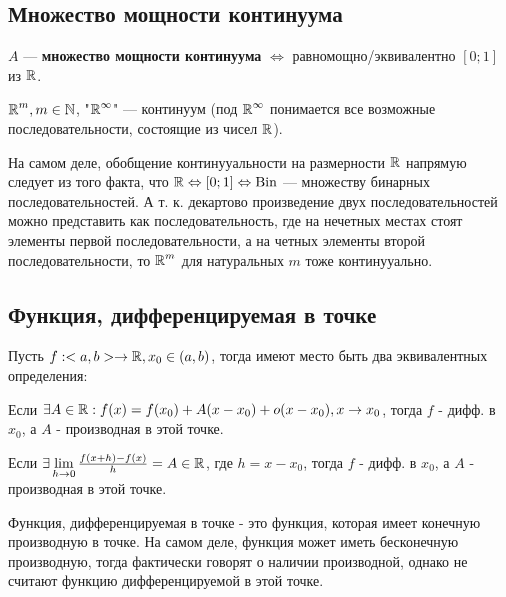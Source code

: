 \subsection{Множество мощности континуума}
\begin{definition}
  $A$ --- \textbf{множество мощности континуума} $\Leftrightarrow$ равномощно/эквивалентно $[0; 1]$ из $\operatorname*{\mathbb{R}}$.
\end{definition}
\begin{consequence}
    $\operatorname*{\mathbb{R}}^m, m \in \operatorname*{\mathbb{N}}$, "$\operatorname*{\mathbb{R}}^\infty$" {---} континуум (под $\operatorname*{\mathbb{R}}^\infty$ понимается все возможные последовательности, состоящие из чисел $\operatorname*{\mathbb{R}}$).
\end{consequence}
\begin{remark}
    На самом деле, обобщение континууальности на размерности $\operatorname*{\mathbb{R}}$ напрямую следует из того факта, что $\operatorname*{\mathbb{R}} \Leftrightarrow [0; 1] \Leftrightarrow \operatorname{Bin}$ {---} множеству бинарных последовательностей. А т. к. декартово произведение двух последовательностей можно представить как последовательность, где на нечетных местах стоят элементы первой последовательности, а на четных элементы второй последовательности, то $\operatorname*{\mathbb{R}}^m$ для натуральных $m$ тоже континууально.
\end{remark}

\newpage
\subsection{Функция, дифференцируемая в точке}
Пусть $f: <a, b> \rightarrow \operatorname*{\mathbb{R}}, x_0 \in (a, b)$, тогда имеют место быть два эквивалентных определения:
\begin{definition}
Если $\exists A \in \operatorname*{\mathbb{R}}: f(x) = f(x_0) + A(x - x_0) + o(x - x_0), x \rightarrow x_0$, тогда $f$ - дифф. в $x_0$, а $A$ - производная в этой точке.
\end{definition}
\begin{definition}
Если $\exists \lim\limits_{h \to 0} \frac{f(x+h)-f(x)}{h} = A \in \operatorname*{\mathbb{R}}$, где $h = x - x_0$, тогда $f$ - дифф. в $x_0$, а $A$ - производная в этой точке. 
\end{definition}
\begin{remark}
    Функция, дифференцируемая в точке - это функция, которая имеет конечную производную в точке. На самом деле, функция может иметь бесконечную производную, тогда фактически говорят о наличии производной, однако не считают функцию дифференцируемой в этой точке.
\end{remark}

